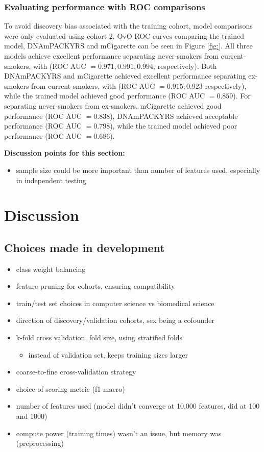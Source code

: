 \documentclass{article}
\begin{document}
\subsubsection{Evaluating  performance with ROC comparisons}
To avoid discovery bias associated with the training cohort, model comparisons were only evaluated using cohort 2. OvO ROC curves comparing the trained model, DNAmPACKYRS and mCigarette can be seen in Figure \ref{fig:}. All three models achieve excellent performance separating never-smokers from current-smokers, with (ROC AUC \(= 0.971, 0.991, 0.994\), respectively). Both DNAmPACKYRS and mCigarette achieved excellent performance separating ex-smokers from current-smokers, with (ROC AUC \(= 0.915, 0.923\) respectively), while the trained model achieved good performance (ROC AUC \(= 0.859\)). For separating never-smokers from ex-smokers, mCigarette achieved good performance (ROC AUC \(= 0.838\)), DNAmPACKYRS achieved acceptable performance (ROC AUC \(= 0.798\)), while the trained model achieved poor performance (ROC AUC \(= 0.686\)). 

\textbf{Discussion points for this section:}
\begin{itemize}
    \item sample size could be more important than number of features used, especially in independent testing
\end{itemize}

\section{Discussion}

\subsection{Choices made in development}
\begin{itemize}
    \item class weight balancing
    \item feature pruning for cohorts, ensuring compatibility
    \item train/test set choices in computer science vs biomedical science
    \item direction of discovery/validation cohorts, sex being a cofounder
    \item k-fold cross validation, fold size, using stratified folds
          \begin{itemize}
              \item instead of validation set, keeps training sizes larger
          \end{itemize}
    \item coarse-to-fine cross-validation strategy
    \item choice of scoring metric (f1-macro)
    \item number of features used (model didn't converge at 10,000 features, did at 100 and 1000)
    \item compute power (training times) wasn't an issue, but memory was (preprocessing)
\end{itemize}
\end{document}

